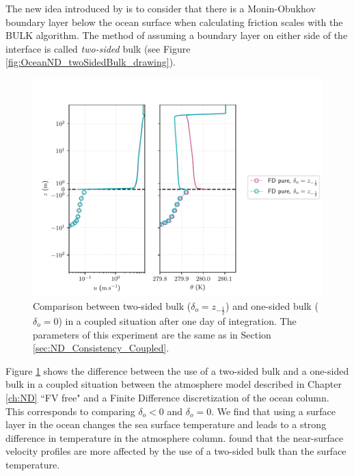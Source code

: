 The new idea introduced by \citep{pelletier_two-sided_2021} is to consider
that there is a Monin-Obukhov boundary layer 
below the ocean surface when calculating friction scales with the BULK algorithm. 
The method of assuming a boundary layer on either side of the interface is called
 \textit{two-sided} bulk (see Figure \ref{fig:OceanND_twoSidedBulk_drawing}).
	\begin{figure}
	\centering
\includegraphics[scale=0.6]{images/compare_two_sided_one_sided.pdf}
	\caption{Comparison between
	two-sided bulk ($\delta_o=z_{-\frac{1}{2}}$) and
	one-sided bulk ($\delta_o=0$) in a coupled
	situation after one day of integration. The parameters
	of this experiment are the same as in
	Section \ref{sec:ND_Consistency_Coupled}.
	}
	\label{fig:OceanND_twoSidedBulk_difference}
\end{figure}
\par
Figure \ref{fig:OceanND_twoSidedBulk_difference} shows the difference
between the use of a two-sided bulk and a one-sided bulk in
a coupled situation between the atmosphere model described in
Chapter \ref{ch:ND} ``FV free" and a Finite Difference
discretization of the ocean column.
This corresponds to comparing $\delta_o < 0$ and $\delta_o = 0$.
We find that using a surface layer in the ocean changes the
sea surface temperature and leads to a strong difference
in temperature in the atmosphere column.
\citep{pelletier_two-sided_2021} found that the near-surface
velocity profiles are more affected by the use of a
two-sided bulk than the surface temperature.

